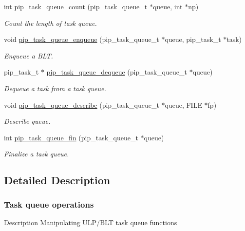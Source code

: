 \begin{DoxyCompactItemize}
int \hyperlink{group__ULP-1-task-queue_ga5a043af776eb89933bfc0a057790cc82}{pip\-\_\-task\-\_\-queue\-\_\-count} (pip\-\_\-task\-\_\-queue\-\_\-t $\ast$queue, int $\ast$np)
\begin{DoxyCompactList}\small\item\em Count the length of task queue. \end{DoxyCompactList}\item 
void \hyperlink{group__ULP-1-task-queue_gae0f80336f51c43c3da988dd0467453cf}{pip\-\_\-task\-\_\-queue\-\_\-enqueue} (pip\-\_\-task\-\_\-queue\-\_\-t $\ast$queue, pip\-\_\-task\-\_\-t $\ast$task)
\begin{DoxyCompactList}\small\item\em Enqueue a B\-L\-T. \end{DoxyCompactList}\item 
pip\-\_\-task\-\_\-t $\ast$ \hyperlink{group__ULP-1-task-queue_ga943bace202c72533951df9fc43f62277}{pip\-\_\-task\-\_\-queue\-\_\-dequeue} (pip\-\_\-task\-\_\-queue\-\_\-t $\ast$queue)
\begin{DoxyCompactList}\small\item\em Dequeue a task from a task queue. \end{DoxyCompactList}\item 
void \hyperlink{group__ULP-1-task-queue_ga7fdea4628abd0c38779276b6cd8ebd3f}{pip\-\_\-task\-\_\-queue\-\_\-describe} (pip\-\_\-task\-\_\-queue\-\_\-t $\ast$queue, F\-I\-L\-E $\ast$fp)
\begin{DoxyCompactList}\small\item\em Describe queue. \end{DoxyCompactList}\item 
int \hyperlink{group__ULP-1-task-queue_ga45d0eaa7122e459ea19187c148b9da10}{pip\-\_\-task\-\_\-queue\-\_\-fin} (pip\-\_\-task\-\_\-queue\-\_\-t $\ast$queue)
\begin{DoxyCompactList}\small\item\em Finalize a task queue. \end{DoxyCompactList}\end{DoxyCompactItemize}


\subsection{Detailed Description}
\hypertarget{ulp-task-queue}{}\subsubsection{Task queue operations}\label{ulp-task-queue}
\begin{DoxyParagraph}{Description}
Manipulating U\-L\-P/\-B\-L\-T task queue functions 
\end{DoxyParagraph}


